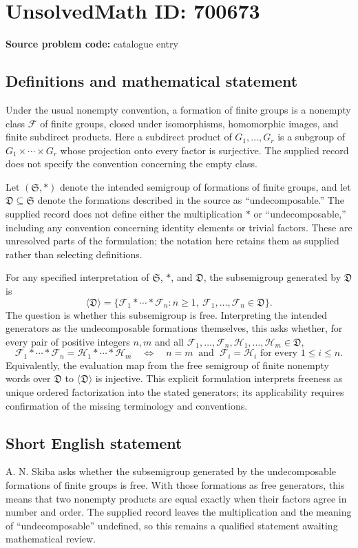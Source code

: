 \documentclass[11pt]{article}
\begin{document}
\section*{UnsolvedMath ID: 700673}
\textbf{Source problem code:} catalogue entry
\subsection{Definitions and mathematical statement}
Under the usual nonempty convention, a formation of finite groups is a nonempty class \(\mathcal F\) of finite groups, closed under isomorphisms, homomorphic images, and finite subdirect products. Here a subdirect product of \(G_1,\ldots,G_r\) is a subgroup of \(G_1\times\cdots\times G_r\) whose projection onto every factor is surjective. The supplied record does not specify the convention concerning the empty class.

Let \((\mathfrak S,\ast)\) denote the intended semigroup of formations of finite groups, and let \(\mathfrak D\subseteq\mathfrak S\) denote the formations described in the source as ``undecomposable.'' The supplied record does not define either the multiplication \(\ast\) or ``undecomposable,'' including any convention concerning identity elements or trivial factors. These are unresolved parts of the formulation; the notation here retains them as supplied rather than selecting definitions.

For any specified interpretation of \(\mathfrak S\), \(\ast\), and \(\mathfrak D\), the subsemigroup generated by \(\mathfrak D\) is
\[
\langle\mathfrak D\rangle
=\{\mathcal F_1\ast\cdots\ast\mathcal F_n:
 n\geq 1,\ \mathcal F_1,\ldots,\mathcal F_n\in\mathfrak D\}.
\]
The question is whether this subsemigroup is free. Interpreting the intended generators as the undecomposable formations themselves, this asks whether, for every pair of positive integers \(n,m\) and all \(\mathcal F_1,\ldots,\mathcal F_n,\mathcal H_1,\ldots,\mathcal H_m\in\mathfrak D\),
\[
\mathcal F_1\ast\cdots\ast\mathcal F_n
=\mathcal H_1\ast\cdots\ast\mathcal H_m
\quad\Longleftrightarrow\quad
n=m\ \text{ and }\ \mathcal F_i=\mathcal H_i
\text{ for every }1\leq i\leq n.
\]
Equivalently, the evaluation map from the free semigroup of finite nonempty words over \(\mathfrak D\) to \(\langle\mathfrak D\rangle\) is injective. This explicit formulation interprets freeness as unique ordered factorization into the stated generators; its applicability requires confirmation of the missing terminology and conventions.
\subsection{Short English statement}
A. N. Skiba asks whether the subsemigroup generated by the undecomposable formations of finite groups is free. With those formations as free generators, this means that two nonempty products are equal exactly when their factors agree in number and order. The supplied record leaves the multiplication and the meaning of ``undecomposable'' undefined, so this remains a qualified statement awaiting mathematical review.
\end{document}
